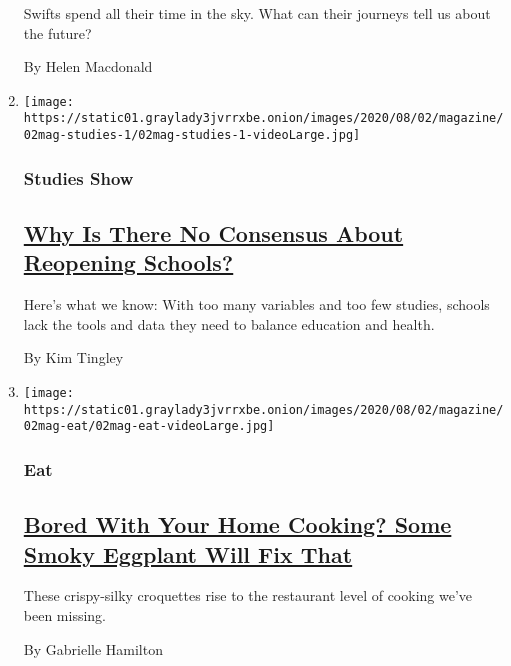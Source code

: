 \begin{enumerate}
  Swifts spend all their time in the sky. What can their journeys tell
  us about the future?

  By Helen Macdonald
\item
  \texttt{[image: https://static01.graylady3jvrrxbe.onion/images/2020/08/02/magazine/02mag-studies-1/02mag-studies-1-videoLarge.jpg]}

  \hypertarget{studies-show}{%
  \subsubsection{Studies Show}\label{studies-show}}

  \hypertarget{why-is-there-no-consensus-about-reopening-schools}{%
  \subsection{\texorpdfstring{\href{/2020/07/29/magazine/schools-reopening-covid.html}{Why
  Is There No Consensus About Reopening
  Schools?}}{Why Is There No Consensus About Reopening Schools?}}\label{why-is-there-no-consensus-about-reopening-schools}}

  Here's what we know: With too many variables and too few studies,
  schools lack the tools and data they need to balance education and
  health.

  By Kim Tingley
\item
  \texttt{[image: https://static01.graylady3jvrrxbe.onion/images/2020/08/02/magazine/02mag-eat/02mag-eat-videoLarge.jpg]}

  \hypertarget{eat}{%
  \subsubsection{Eat}\label{eat}}

  \hypertarget{bored-with-your-home-cooking-some-smoky-eggplant-will-fix-that}{%
  \subsection{\texorpdfstring{\href{/2020/07/29/magazine/bored-with-your-home-cooking-some-smoky-eggplant-will-fix-that.html}{Bored
  With Your Home Cooking? Some Smoky Eggplant Will Fix
  That}}{Bored With Your Home Cooking? Some Smoky Eggplant Will Fix That}}\label{bored-with-your-home-cooking-some-smoky-eggplant-will-fix-that}}

  These crispy-silky croquettes rise to the restaurant level of cooking
  we've been missing.

  By Gabrielle Hamilton
\end{enumerate}

